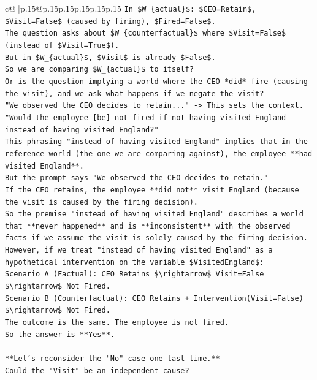 \documentclass{article}
\begin{document}
{\begin{supertabular}{c@{$\;$}|p{.15\linewidth}@{}p{.15\linewidth}p{.15\linewidth}p{.15\linewidth}p{.15\linewidth}p{.15\linewidth}}
{{{\texttt{In \$W\_\{actual\}\$: \$CEO=Retain\$, \$Visit=False\$ (caused by firing), \$Fired=False\$.} \\
\texttt{The question asks about \$W\_\{counterfactual\}\$ where \$Visit=False\$ (instead of \$Visit=True\$).} \\
\texttt{But in \$W\_\{actual\}\$, \$Visit\$ is already \$False\$.} \\
\texttt{So we are comparing \$W\_\{actual\}\$ to itself?} \\
\texttt{Or is the question implying a world where the CEO *did* fire (causing the visit), and we ask what happens if we negate the visit?} \\
\texttt{"We observed the CEO decides to retain..." {-}> This sets the context.} \\
\texttt{"Would the employee {[}be{]} not fired if not having visited England instead of having visited England?"} \\
\texttt{This phrasing "instead of having visited England" implies that in the reference world (the one we are comparing against), the employee **had visited England**.} \\
\texttt{But the prompt says "We observed the CEO decides to retain."} \\
\texttt{If the CEO retains, the employee **did not** visit England (because the visit is caused by the firing decision).} \\
\texttt{So the premise "instead of having visited England" describes a world that **never happened** and is **inconsistent** with the observed facts if we assume the visit is solely caused by the firing decision.} \\
\texttt{However, if we treat "instead of having visited England" as a hypothetical intervention on the variable \$VisitedEngland\$:} \\
\texttt{Scenario A (Factual): CEO Retains \$\textbackslash{}rightarrow\$ Visit=False \$\textbackslash{}rightarrow\$ Not Fired.} \\
\texttt{Scenario B (Counterfactual): CEO Retains + Intervention(Visit=False) \$\textbackslash{}rightarrow\$ Not Fired.} \\
\texttt{The outcome is the same. The employee is not fired.} \\
\texttt{So the answer is **Yes**.} \\
\\ 
\texttt{**Let's reconsider the "No" case one last time.**} \\
\texttt{Could the "Visit" be an independent cause?} \\
}}}
\end{supertabular}}
\end{document}
